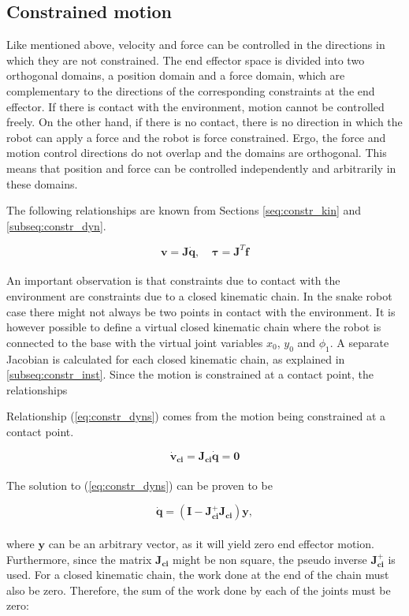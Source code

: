 \subsection{Constrained  motion}\label{subseq:HPFC}
Like mentioned above, velocity and force can be controlled in the directions in which they are not constrained. The end effector space is divided into two orthogonal domains, a position domain and a force domain, which are complementary to the directions of the corresponding constraints at the end effector. If there is contact with the environment, motion cannot be controlled freely. On the other hand, if there is no contact, there is no direction in which the robot can apply a force and the robot is force constrained. Ergo, the force and motion control directions do not overlap and the domains are orthogonal. This means that position and force can be controlled independently and arbitrarily in these domains.

The following relationships are known from Sections \ref{seq:constr_kin} and \ref{subseq:constr_dyn}. 

\begin{equation}
	\mathbf{v = J \dot{q}} \textrm{,} \quad  \  \boldsymbol{\tau} \mathbf{= J}^T \mathbf{f}
\end{equation}
\\
An important observation is that constraints due to contact with the environment are constraints due to a closed kinematic chain. In the snake robot case there might not always be two points in contact with the environment. It is however possible to define a virtual closed kinematic chain where the robot is connected to the base with the virtual joint variables $x_0$, $y_0$ and $\phi_1$.
A separate Jacobian is calculated for each closed kinematic chain, as explained in \ref{subseq:constr_inst}.
Since the motion is constrained at a contact point, the relationships

Relationship (\ref{eq:constr_dyns}) comes from the motion being constrained at a contact point.

\begin{equation} \label{eq:constr_dyns}
    \mathbf{\dot{v}_{ci} = J_{ci} \dot{q} = 0}
\end{equation}
\\
The solution to (\ref{eq:constr_dyns}) can be proven to be

\begin{equation}
    \mathbf{\dot{q} = (I - J_{ci}^+ J_{ci}) y},
\end{equation}
\\
where $\mathbf{y}$ can be an arbitrary vector, as it will yield zero end effector motion. Furthermore, since the matrix $\mathbf{J_{ci}}$ might be non square, the pseudo inverse $\mathbf{J_{ci}^+}$ is used.
For a closed kinematic chain, the work done at the end of the chain must also be zero. Therefore, the sum of the work done by each of the joints must be zero:

